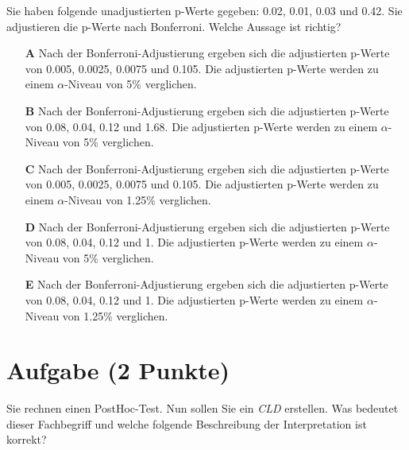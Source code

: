 \documentclass[a4paper, 9pt]{scrartcl}\usepackage[]{graphicx}\usepackage[]{xcolor}
\begin{document}
Sie haben folgende unadjustierten p-Werte gegeben: 0.02, 0.01, 0.03 und 0.42. Sie adjustieren die p-Werte nach
Bonferroni. Welche Aussage ist richtig?



\begin{enumerate}
\item [\textbf{A} \msquare] Nach der Bonferroni-Adjustierung ergeben sich die adjustierten p-Werte von 0.005, 0.0025, 0.0075 und 0.105. Die adjustierten p-Werte werden zu einem $\alpha$-Niveau von 5\% verglichen.
\item [\textbf{B} \msquare] Nach der Bonferroni-Adjustierung ergeben sich die adjustierten p-Werte von 0.08, 0.04, 0.12 und 1.68. Die adjustierten p-Werte werden zu einem $\alpha$-Niveau von 5\% verglichen.
\item [\textbf{C} \msquare] Nach der Bonferroni-Adjustierung ergeben sich die adjustierten p-Werte von 0.005, 0.0025, 0.0075 und 0.105. Die adjustierten p-Werte werden zu einem $\alpha$-Niveau von 1.25\% verglichen.
\item [\textbf{D} \msquare] Nach der Bonferroni-Adjustierung ergeben sich die adjustierten p-Werte von 0.08, 0.04, 0.12 und 1. Die adjustierten p-Werte werden zu einem $\alpha$-Niveau von 5\% verglichen.
\item [\textbf{E} \msquare] Nach der Bonferroni-Adjustierung ergeben sich die adjustierten p-Werte von 0.08, 0.04, 0.12 und 1. Die adjustierten p-Werte werden zu einem $\alpha$-Niveau von 1.25\% verglichen.
\end{enumerate}

\section{Aufgabe \hfill (2 Punkte)}



Sie rechnen einen PostHoc-Test. Nun sollen Sie ein \textit{CLD} erstellen. Was bedeutet dieser Fachbegriff und welche folgende Beschreibung der Interpretation ist korrekt?
\end{document}
